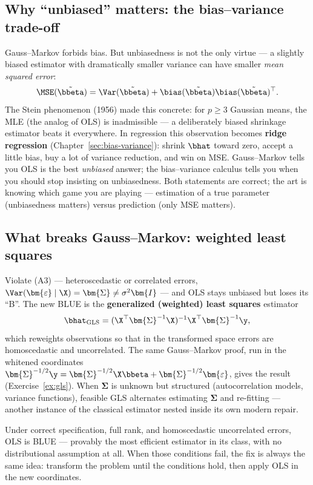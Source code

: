 \subsection{Why ``unbiased'' matters: the bias--variance trade-off}

Gauss--Markov forbids bias. But unbiasedness is not the only virtue — a slightly biased estimator with dramatically smaller variance can have smaller \emph{mean squared error}:
\[
  \MSE(\tilde{\bbeta}) = \Var(\tilde{\bbeta}) + \bias(\tilde{\bbeta})\bias(\tilde{\bbeta})^\top.
\]
The Stein phenomenon (1956) made this concrete: for $p \geq 3$ Gaussian means, the MLE (the analog of OLS) is inadmissible — a deliberately biased shrinkage estimator beats it everywhere. In regression this observation becomes \textbf{ridge regression} (Chapter~\ref{sec:bias-variance}): shrink $\bhat$ toward zero, accept a little bias, buy a lot of variance reduction, and win on MSE. Gauss--Markov tells you OLS is the best \emph{unbiased} answer; the bias--variance calculus tells you when you should stop insisting on unbiasedness. Both statements are correct; the art is knowing which game you are playing — estimation of a true parameter (unbiasedness matters) versus prediction (only MSE matters).

\subsection{What breaks Gauss--Markov: weighted least squares}

Violate (A3) — heteroscedastic or correlated errors, $\Var(\bm{\varepsilon}\mid\X) = \bm{\Sigma} \neq \sigma^2 \bm{I}$ — and OLS stays unbiased but loses its ``B''. The new BLUE is the \textbf{generalized (weighted) least squares} estimator
\[
  \bhat_{\mathrm{GLS}} = (\X^\top \bm{\Sigma}^{-1} \X)^{-1} \X^\top \bm{\Sigma}^{-1} \y,
\]
which reweights observations so that in the transformed space errors are homoscedastic and uncorrelated. The same Gauss--Markov proof, run in the whitened coordinates $\bm{\Sigma}^{-1/2}\y = \bm{\Sigma}^{-1/2}\X\bbeta + \bm{\Sigma}^{-1/2}\bm{\varepsilon}$, gives the result (Exercise~\ref{ex:gls}). When $\bm{\Sigma}$ is unknown but structured (autocorrelation models, variance functions), feasible GLS alternates estimating $\bm{\Sigma}$ and re-fitting — another instance of the classical estimator nested inside its own modern repair.

\begin{keybox}
Under correct specification, full rank, and homoscedastic uncorrelated errors, OLS is BLUE — provably the most efficient estimator in its class, with no distributional assumption at all. When those conditions fail, the fix is always the same idea: transform the problem until the conditions hold, then apply OLS in the new coordinates.
\end{keybox}
